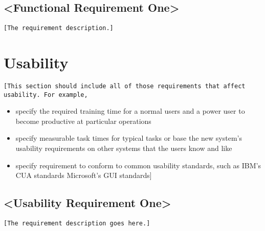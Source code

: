 \documentclass[a4paper,12pt,chapterprefix=false,bibliography=totoc,listof=totoc]{scrreprt}
\begin{document}
\subsection{<Functional Requirement One>}
\begin{verbatim}
[The requirement description.]
\end{verbatim}

\section{Usability}
\begin{verbatim}
[This section should include all of those requirements that affect usability. For example,
\end{verbatim}
\begin{itemize}
	\item specify the required training time for a normal users and a power user to become productive at particular operations
	\item specify measurable task times for typical tasks or base the new system’s usability requirements on other systems that the users know and like
	\item specify requirement to conform to common usability standards, such as IBM’s CUA standards Microsoft’s GUI standards]
\end{itemize}

\subsection{<Usability Requirement One>}
\begin{verbatim}
[The requirement description goes here.]
\end{verbatim}
\end{document}
